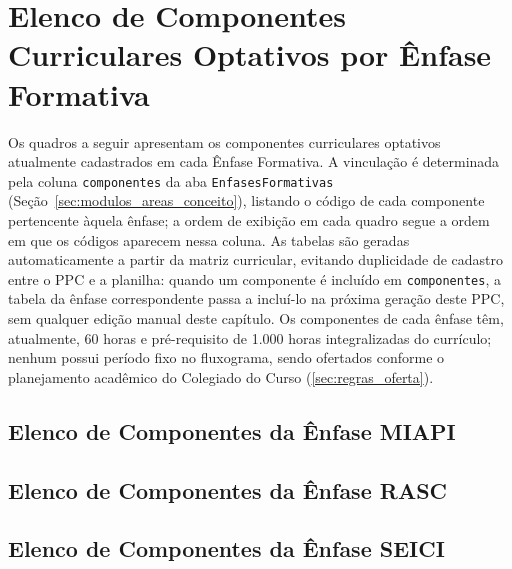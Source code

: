 \section{Elenco de Componentes Curriculares Optativos por Ênfase Formativa}
\label{sec:elenco_areas}

Os quadros a seguir apresentam os componentes curriculares optativos atualmente cadastrados em cada Ênfase Formativa. A vinculação é determinada pela coluna \texttt{componentes} da aba \texttt{EnfasesFormativas} (Seção~\ref{sec:modulos_areas_conceito}), listando o código de cada componente pertencente àquela ênfase; a ordem de exibição em cada quadro segue a ordem em que os códigos aparecem nessa coluna. As tabelas são geradas automaticamente a partir da matriz curricular, evitando duplicidade de cadastro entre o PPC e a planilha: quando um componente é incluído em \texttt{componentes}, a tabela da ênfase correspondente passa a incluí-lo na próxima geração deste PPC, sem qualquer edição manual deste capítulo. Os componentes de cada ênfase têm, atualmente, 60 horas e pré-requisito de 1.000 horas integralizadas do currículo; nenhum possui período fixo no fluxograma, sendo ofertados conforme o planejamento acadêmico do Colegiado do Curso (\autoref{sec:regras_oferta}).

\subsection{Elenco de Componentes da Ênfase MIAPI}


\subsection{Elenco de Componentes da Ênfase RASC}


\subsection{Elenco de Componentes da Ênfase SEICI}


